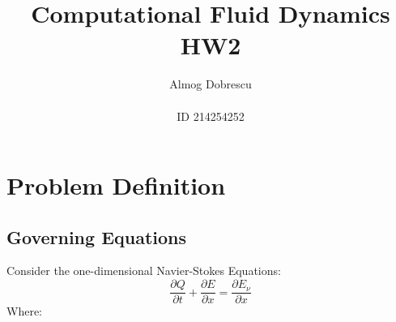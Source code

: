 \documentclass[11pt, a4paper]{article}
\title{Computational Fluid Dynamics \\ HW2}
\author{Almog Dobrescu\\\\ID 214254252}
\begin{document}
\maketitle
\thispagestyle{empty}
\newpage

\thispagestyle{empty}
\tableofcontents
\vfil
\listoffigures
\newpage

\thispagestyle{empty}
\printnomenclature
\newpage

\setcounter{page}{1}
\section{Problem Definition}
\subsection{Governing Equations}
Consider the one-dimensional Navier-Stokes Equations:
\begin{equation}
    \frac{\partial Q}{\partial t}+\frac{\partial E}{\partial x}=\frac{\partial E_\nu}{\partial x}
\end{equation}
Where:
\end{document}
